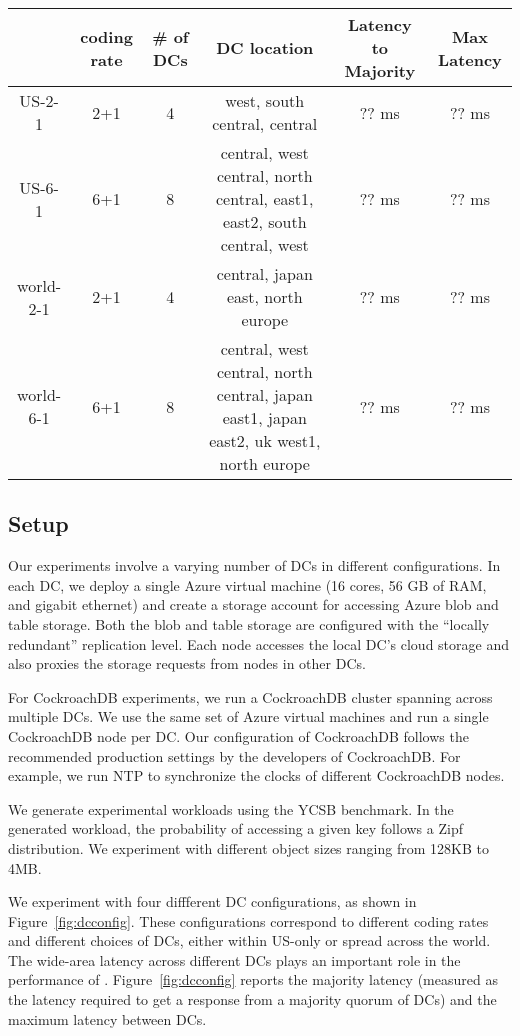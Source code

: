 \begin{figure*}
\begin{tabular}{c|c|c|c|c|c}
& coding rate & \# of DCs & DC location & Latency to Majority & Max Latency\\
\hline
US-2-1 & 2+1 & 4 & west, south central, central & ?? ms& ?? ms\\
US-6-1 & 6+1 & 8 & central, west central, north central, east1, east2, south central, west&?? ms&?? ms\\ 
world-2-1 & 2+1 & 4 & central, japan east, north europe &?? ms &?? ms\\
world-6-1 & 6+1 & 8 & central, west central, north central, japan east1, japan east2, uk west1, north europe &?? ms &?? ms\\
\end{tabular}
\caption{The DC configurations and inter-DC latencies in various experiments~\label{fig:dcconfig}} 
\end{figure*}

\subsection{Setup}
Our experiments involve a varying number of DCs in different configurations. In
each DC, we deploy a single Azure virtual machine (16 cores, 56 GB of RAM, and
gigabit ethernet) and create a storage account for accessing Azure blob and
table storage. Both the blob and table storage are configured with the
``locally redundant'' replication level.  Each \name node accesses the local
DC's cloud storage and also proxies the storage requests from \name nodes in
other DCs.  

For CockroachDB experiments, we run a CockroachDB cluster spanning across
multiple DCs.  We use the same set of Azure virtual machines and run a single
CockroachDB node per DC. Our configuration of CockroachDB follows the
recommended production settings by the developers of CockroachDB. For example,
we run NTP to synchronize the clocks of different CockroachDB nodes. 

We generate experimental workloads using the YCSB benchmark. In the generated
workload, the probability of accessing a given key follows a Zipf distribution.
We experiment with different object sizes ranging from 128KB to 4MB. 

We experiment with four diffferent DC configurations, as shown in
Figure~\ref{fig:dcconfig}.  These configurations correspond to different coding
rates and different choices of DCs, either within US-only or spread across the
world. The wide-area latency across different DCs plays an important role in 
the performance of \name.  Figure~\ref{fig:dcconfig} reports the majority
latency (measured as the latency required to get a response from a majority
quorum of DCs) and the maximum latency between DCs.

